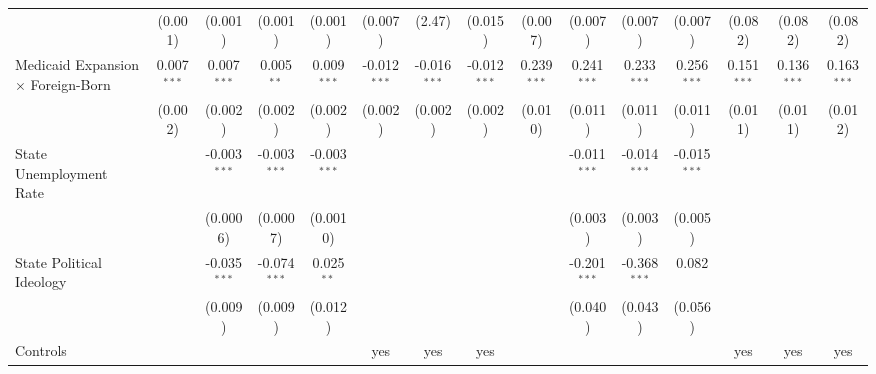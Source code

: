 \documentclass[
]{article}
\let\origtable\table
\let\endorigtable\endtable
\renewenvironment{table}[1][ht]{
      \expandafter\origtable\expandafter[H]
    }{
      \endorigtable
    }
\begin{document}
\begin{table}[htbp]
\begin{adjustbox}{width = 1.5\textwidth, center}
\begin{threeparttable}[b]
\begin{tabular}{lcccccccccccccc}
                                                      & (0.001)        & (0.001)        & (0.001)        & (0.001)        & (0.007)        & (2.47)         & (0.015)        & (0.007)        & (0.007)        & (0.007)        & (0.007)        & (0.082)       & (0.082)       & (0.082)\\   
            Medicaid Expansion $\times$ Foreign-Born  & 0.007$^{***}$  & 0.007$^{***}$  & 0.005$^{**}$   & 0.009$^{***}$  & -0.012$^{***}$ & -0.016$^{***}$ & -0.012$^{***}$ & 0.239$^{***}$  & 0.241$^{***}$  & 0.233$^{***}$  & 0.256$^{***}$  & 0.151$^{***}$ & 0.136$^{***}$ & 0.163$^{***}$\\   
                                                      & (0.002)        & (0.002)        & (0.002)        & (0.002)        & (0.002)        & (0.002)        & (0.002)        & (0.010)        & (0.011)        & (0.011)        & (0.011)        & (0.011)       & (0.011)       & (0.012)\\   
            State Unemployment Rate                   &                & -0.003$^{***}$ & -0.003$^{***}$ & -0.003$^{***}$ &                &                &                &                & -0.011$^{***}$ & -0.014$^{***}$ & -0.015$^{***}$ &               &               &   \\   
                                                      &                & (0.0006)       & (0.0007)       & (0.0010)       &                &                &                &                & (0.003)        & (0.003)        & (0.005)        &               &               &   \\   
            State Political Ideology                  &                & -0.035$^{***}$ & -0.074$^{***}$ & 0.025$^{**}$   &                &                &                &                & -0.201$^{***}$ & -0.368$^{***}$ & 0.082          &               &               &   \\   
                                                      &                & (0.009)        & (0.009)        & (0.012)        &                &                &                &                & (0.040)        & (0.043)        & (0.056)        &               &               &   \\   
            \midrule 
            Controls                                  &                &                &                &                & yes            & yes            & yes            &                &                &                &                & yes           & yes           & yes\\  

\end{tabular}
\end{threeparttable}
\end{adjustbox}
\end{table}
\end{document}
